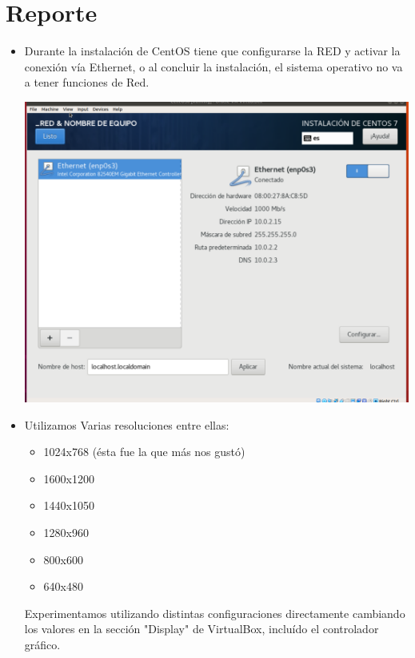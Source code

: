 \documentclass[a4paper, 11pt, oneside]{article}
\begin{document}
\section*{Reporte}
\begin{itemize}
    \item Durante la instalación de CentOS tiene que configurarse la RED y activar la conexión vía Ethernet, o al concluir la instalación, el sistema operativo no va a tener funciones de Red.
    \begin{center}
        \includegraphics[scale=0.25]{ethernet.png}
    \end{center}
    \item Utilizamos Varias resoluciones entre ellas:
        \begin{itemize}
            \item 1024x768      (ésta fue la que más nos gustó) 
            \item 1600x1200     
            \item 1440x1050       
            \item 1280x960        
            \item 800x600         
            \item 640x480         

        \end{itemize}
        Experimentamos utilizando distintas configuraciones directamente cambiando los valores en 
        la sección "Display" de VirtualBox, incluído el controlador gráfico.
        

\end{itemize}
\end{document}

